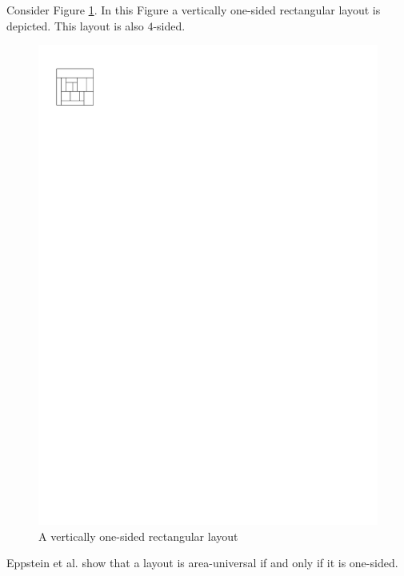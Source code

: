   Consider Figure \ref{fig:rect:vertonesided}. In this Figure a vertically one-sided rectangular layout is depicted. This layout is also $4$-sided.
  \begin{figure}[h]
    \centering
    \includegraphics[scale=1]{rectangularDuals/img/vertonesided}
    \caption{A vertically one-sided rectangular layout}
    \label{fig:rect:vertonesided}
  \end{figure}

  Eppstein et al. \cite{Eppstein2012} show that a layout is area-universal if and only if it is one-sided. 


